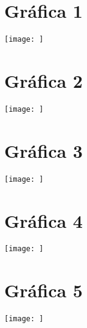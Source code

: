 \documentclass[letterpaper, 12pt]{article}
\begin{document}
\setcounter{page}{1}
\thispagestyle{fancy}
\section{Gráfica 1}
\begin{center}
    \texttt{[image: ]}
\end{center}
\section{Gráfica 2}
\begin{center}
    \texttt{[image: ]}
\end{center}
\section{Gráfica 3}
\begin{center}
    \texttt{[image: ]}
\end{center}
\section{Gráfica 4}
\begin{center}
    \texttt{[image: ]}
\end{center}
\section{Gráfica 5}
\begin{center}
    \texttt{[image: ]}
\end{center}
\end{document}
